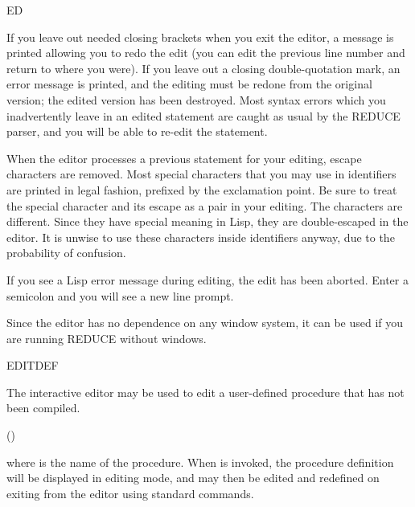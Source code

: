 \begin{Command}[ed]{ED}
\begin{Comments}
If you leave out needed closing brackets when you exit the editor, a message 
is printed allowing you to redo the edit (you can edit the previous line
number and return to where you were).  If you leave out a closing 
double-quotation mark, an error message is printed, and the editing must be
redone from the original version; the edited version has been destroyed.
Most syntax errors which you inadvertently leave in an edited statement are 
caught as usual by the REDUCE parser, and you will be able to re-edit the
statement.   

When the editor processes a previous statement for your editing, escape
characters are removed.  Most special characters that you may use in
identifiers are printed in legal fashion, prefixed by the exclamation
point.  Be sure to treat the special character and its escape as a pair in
your editing.  The characters  are different.  Since
they have special meaning in Lisp, they are double-escaped in the editor.
It is unwise to use these characters inside identifiers anyway, due to the
probability of confusion.

If you see a Lisp error message during editing, the edit has been aborted.
Enter a semicolon and you will see a new line prompt.

Since the editor has no dependence on any window system, it can be used if you
are running REDUCE without windows.
\end{Comments}
\end{Command}


\begin{Command}[editdef]{EDITDEF}

The interactive editor  may be used to edit a user-defined
procedure that has not been compiled.
\begin{Syntax}
()
\end{Syntax}
where  is the name of the procedure.  When 
is invoked, the procedure definition will be displayed in editing mode,
and may then be edited and redefined on exiting from the editor using
standard  commands.

\end{Command}


